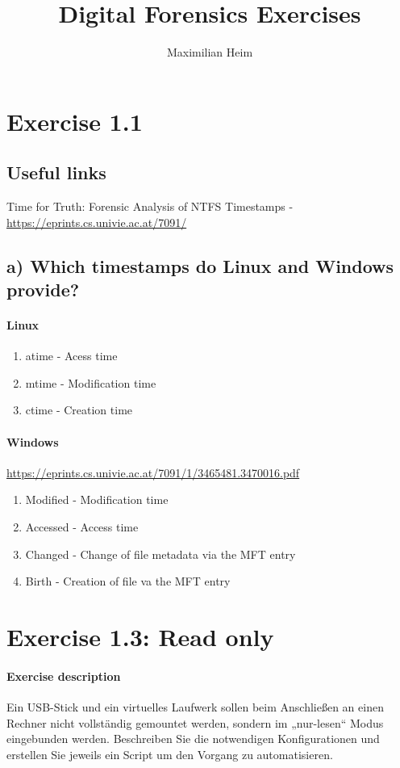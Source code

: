 \documentclass[10pt,a4paper]{article}
\author{Maximilian Heim}
\title{Digital Forensics Exercises}
\begin{document}
\maketitle
\newpage
\tableofcontents
\newpage
\section{Exercise 1.1}
\subsection{Useful links}
Time for Truth: Forensic Analysis of NTFS Timestamps - \url{https://eprints.cs.univie.ac.at/7091/}
\subsection{a) Which timestamps do Linux and Windows provide?}
\paragraph{Linux}
\begin{enumerate}
    \item atime - Acess time
    \item mtime - Modification time
    \item ctime - Creation time
\end{enumerate}

\paragraph{Windows}
\url{https://eprints.cs.univie.ac.at/7091/1/3465481.3470016.pdf}
\begin{enumerate}
    \item Modified - Modification time
    \item Accessed - Access time
    \item Changed - Change of file metadata via the MFT entry
    \item Birth - Creation of file va the MFT entry
\end{enumerate}

\section{Exercise 1.3: Read only}
\paragraph{Exercise description}
Ein USB-Stick und ein virtuelles Laufwerk sollen beim Anschließen an einen Rechner nicht vollständig gemountet werden,
sondern im „nur-lesen“ Modus eingebunden werden. Beschreiben Sie die notwendigen Konfigurationen und erstellen Sie
jeweils ein Script um den Vorgang zu automatisieren.
\end{document}
